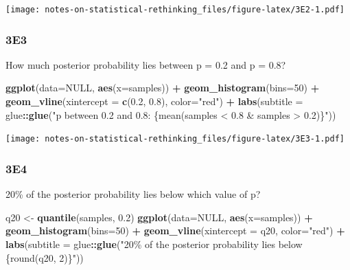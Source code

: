 \documentclass[
]{book}
\newenvironment{Shaded}{\begin{snugshade}}{\end{snugshade}}
\newcommand{\DataTypeTok}[1]{\textcolor[rgb]{0.13,0.29,0.53}{#1}}
\newcommand{\DecValTok}[1]{\textcolor[rgb]{0.00,0.00,0.81}{#1}}
\newcommand{\FloatTok}[1]{\textcolor[rgb]{0.00,0.00,0.81}{#1}}
\newcommand{\KeywordTok}[1]{\textcolor[rgb]{0.13,0.29,0.53}{\textbf{#1}}}
\newcommand{\NormalTok}[1]{#1}
\newcommand{\OperatorTok}[1]{\textcolor[rgb]{0.81,0.36,0.00}{\textbf{#1}}}
\newcommand{\OtherTok}[1]{\textcolor[rgb]{0.56,0.35,0.01}{#1}}
\newcommand{\StringTok}[1]{\textcolor[rgb]{0.31,0.60,0.02}{#1}}
\begin{document}
\texttt{[image: notes-on-statistical-rethinking\_files/figure-latex/3E2-1.pdf]}

\hypertarget{e3-1}{%
\subsubsection*{3E3}\label{e3-1}}

How much posterior probability lies between p = 0.2 and p = 0.8?

\begin{Shaded}
\begin{Highlighting}[]
\KeywordTok{ggplot}\NormalTok{(}\DataTypeTok{data=}\OtherTok{NULL}\NormalTok{, }\KeywordTok{aes}\NormalTok{(}\DataTypeTok{x=}\NormalTok{samples)) }\OperatorTok{+}\StringTok{ }
\StringTok{  }\KeywordTok{geom\_histogram}\NormalTok{(}\DataTypeTok{bins=}\DecValTok{50}\NormalTok{) }\OperatorTok{+}\StringTok{ }
\StringTok{  }\KeywordTok{geom\_vline}\NormalTok{(}\DataTypeTok{xintercept =} \KeywordTok{c}\NormalTok{(}\FloatTok{0.2}\NormalTok{, }\FloatTok{0.8}\NormalTok{), }\DataTypeTok{color=}\StringTok{"red"}\NormalTok{) }\OperatorTok{+}\StringTok{ }
\StringTok{  }\KeywordTok{labs}\NormalTok{(}\DataTypeTok{subtitle =}\NormalTok{ glue}\OperatorTok{::}\KeywordTok{glue}\NormalTok{(}\StringTok{"p between 0.2 and 0.8: \{mean(samples \textless{} 0.8 \& samples \textgreater{} 0.2)\}"}\NormalTok{))}
\end{Highlighting}
\end{Shaded}

\texttt{[image: notes-on-statistical-rethinking\_files/figure-latex/3E3-1.pdf]}

\hypertarget{e4-1}{%
\subsubsection*{3E4}\label{e4-1}}

20\% of the posterior probability lies below which value of p?

\begin{Shaded}
\begin{Highlighting}[]
\NormalTok{q20 \textless{}{-}}\StringTok{ }\KeywordTok{quantile}\NormalTok{(samples, }\FloatTok{0.2}\NormalTok{)}
\KeywordTok{ggplot}\NormalTok{(}\DataTypeTok{data=}\OtherTok{NULL}\NormalTok{, }\KeywordTok{aes}\NormalTok{(}\DataTypeTok{x=}\NormalTok{samples)) }\OperatorTok{+}\StringTok{ }
\StringTok{  }\KeywordTok{geom\_histogram}\NormalTok{(}\DataTypeTok{bins=}\DecValTok{50}\NormalTok{) }\OperatorTok{+}\StringTok{ }
\StringTok{  }\KeywordTok{geom\_vline}\NormalTok{(}\DataTypeTok{xintercept =}\NormalTok{ q20, }\DataTypeTok{color=}\StringTok{"red"}\NormalTok{) }\OperatorTok{+}\StringTok{ }
\StringTok{  }\KeywordTok{labs}\NormalTok{(}\DataTypeTok{subtitle =}\NormalTok{ glue}\OperatorTok{::}\KeywordTok{glue}\NormalTok{(}\StringTok{"20\% of the posterior probability lies below \{round(q20, 2)\}"}\NormalTok{))}
\end{Highlighting}
\end{Shaded}
\end{document}
